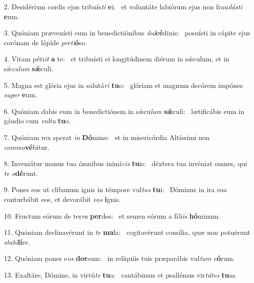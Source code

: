 2. Desidérium cordis ejus tribuís\textit{ti} \textbf{e}i: \ast\  et voluntáte labiórum ejus non frau\textit{dás}\textit{ti} \textbf{e}um.\

3. Quóniam prævenísti eum in benedictiónibus \textit{dul}\textbf{cé}dinis: \ast\  posuísti in cápite ejus corónam de lápide \textit{pre}\textit{ti}\textbf{ó}so.\

4. Vitam péti\textit{it} \textbf{a} te: \ast\  et tribuísti ei longitúdinem diérum in sǽculum, et in sǽ\textit{cu}\textit{lum} \textbf{sǽ}culi.\

5. Magna est glória ejus in salutá\textit{ri} \textbf{tu}o: \ast\  glóriam et magnum decórem impónes \textit{su}\textit{per} \textbf{e}um.\

6. Quóniam dabis eum in benedictiónem in sǽcu\textit{lum} \textbf{sǽ}culi: \ast\  lætificábis eum in gáudio cum \textit{vul}\textit{tu} \textbf{tu}o.\

7. Quóniam rex sperat \textit{in} \textbf{Dó}mino: \ast\  et in misericórdia Altíssimi non \textit{com}\textit{mo}\textbf{vé}bitur.\

8. Inveniátur manus tua ómnibus inimí\textit{cis} \textbf{tu}is: \ast\  déxtera tua invéniat omnes, qui \textit{te} \textit{o}\textbf{dé}runt.\

9. Pones eos ut clíbanum ignis in témpore vul\textit{tus} \textbf{tu}i: \ast\  Dóminus in ira sua conturbábit eos, et devorábit \textit{e}\textit{os} \textbf{i}gnis.\

10. Fructum eórum de ter\textit{ra} \textbf{per}des: \ast\  et semen eórum a fí\textit{li}\textit{is} \textbf{hó}minum.\

11. Quóniam declinavérunt in \textit{te} \textbf{ma}la: \ast\  cogitavérunt consília, quæ non potuérunt \textit{sta}\textit{bi}\textbf{lí}re.\

12. Quóniam pones e\textit{os} \textbf{dor}sum: \ast\  in relíquiis tuis præparábis vul\textit{tum} \textit{e}\textbf{ó}rum.\

13. Exaltáre, Dómine, in virtú\textit{te} \textbf{tu}a: \ast\  cantábimus et psallémus vir\textit{tú}\textit{tes} \textbf{tu}as.\

